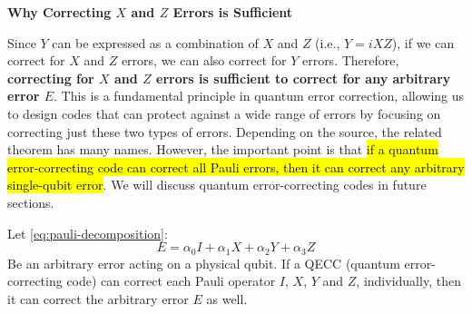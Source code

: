 \highspace
\begin{flushleft}
    \textcolor{Green3}{ \textbf{Why Correcting $X$ and $Z$ Errors is Sufficient}}
\end{flushleft}
Since $Y$ can be expressed as a combination of $X$ and $Z$ (i.e., $Y = iXZ$), if we can correct for $X$ and $Z$ errors, we can also correct for $Y$ errors. Therefore, \textbf{correcting for $X$ and $Z$ errors is sufficient to correct for any arbitrary error $E$}. This is a fundamental principle in quantum error correction, allowing us to design codes that can protect against a wide range of errors by focusing on correcting just these two types of errors. Depending on the source, the related theorem has many names. However, the important point is that \hl{if a quantum error-correcting code can correct all Pauli errors, then it can correct any arbitrary single-qubit error}. We will discuss quantum error-correcting codes in future sections.

\highspace
\begin{theorem}
    Let \autoref{eq:pauli-decomposition}:
    \begin{equation*}
        E = \alpha_0 I + \alpha_1 X + \alpha_2 Y + \alpha_3 Z
    \end{equation*}
    Be an arbitrary error acting on a physical qubit. If a QECC (quantum error-correcting code) can correct each Pauli operator $I$, $X$, $Y$ and $Z$, individually, then it can correct the arbitrary error $E$ as well.
\end{theorem}